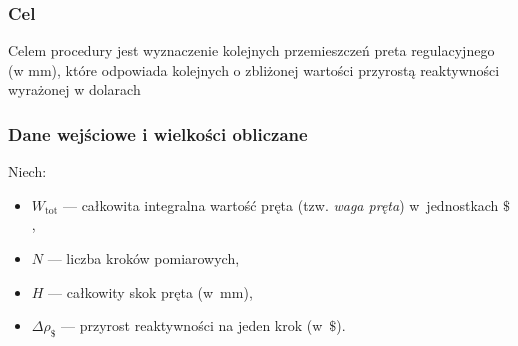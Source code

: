 

\subsubsection{Cel}
Celem procedury jest wyznaczenie kolejnych przemieszczeń preta regulacyjnego (w mm), które odpowiada kolejnych o zbliżonej wartości przyrostą reaktywności wyrażonej w dolarach 
\subsubsection{Dane wejściowe i wielkości obliczane}
Niech:
\begin{itemize}
	\item \(W_{\mathrm{tot}}\) --- całkowita integralna wartość pręta (tzw. \emph{waga pręta}) w~jednostkach \(\$\),
	\item \(N\) --- liczba kroków pomiarowych,
	\item \(H\) --- całkowity skok pręta (w~mm),
	\item \(\Delta \rho_\$\) --- przyrost reaktywności na jeden krok (w~\(\$\)).
\end{itemize}

